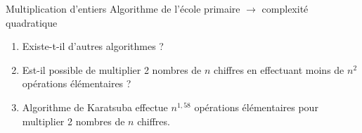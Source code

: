 \begin{frame}{Multiplication d'entiers}
  Algorithme de l'école primaire $\longrightarrow$ complexité quadratique
  \begin{enumerate}
  \item <2->Existe-t-il d'autres algorithmes ?
  \item <3-> Est-il possible de multiplier 2 nombres de $n$ chiffres en effectuant
moins de $n^2$  opérations élémentaires ? 
\item <4-> Algorithme de Karatsuba effectue $n^{1,58}$ opérations élémentaires pour multiplier 2 nombres de $n$ chiffres.
\end{enumerate}
\end{frame}
%
%
%
%
%
